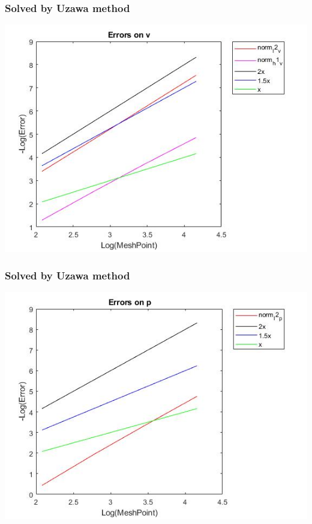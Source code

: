 \documentclass[11pt]{beamer}
\numberwithin{equation}{section}
\theoremstyle{plain}
\theoremstyle{definition}
\theoremstyle{remark}
\begin{document}
\begin{frame}\frametitle{Solved by Uzawa method}
\includegraphics[scale=0.5]{16}
\end{frame}
\begin{frame}\frametitle{Solved by Uzawa method}
\includegraphics[scale=0.5]{17}
\end{frame}
\end{document}

